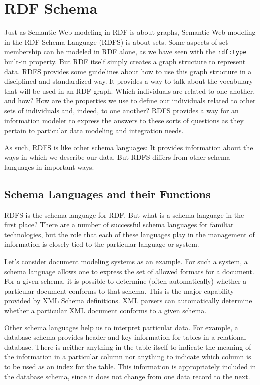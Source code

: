 \chapter{RDF Schema}
\label{ch8}

Just as Semantic Web modeling in RDF is about graphs, Semantic Web
modeling in the RDF Schema Language (RDFS) is about sets. Some aspects
of set membership can be modeled in RDF alone, as we have seen with the
\texttt{rdf:type} built-in property. But RDF itself simply creates a graph
structure to represent data. RDFS provides some guidelines about how to
use this graph structure in a disciplined and standardized way. It
provides a way to talk about the vocabulary that will be used in an RDF
graph. Which individuals are related to one another, and how? How are
the properties we use to define our individuals related to other sets of
individuals and, indeed, to one another? RDFS provides a way for an
information modeler to express the answers to these sorts of questions
as they pertain to particular data modeling and integration needs.

As such, RDFS is like other schema languages: It provides information
about the ways in which we describe our data. But RDFS differs from
other schema languages in important ways.

\section{Schema Languages and their Functions}

RDFS is the schema language for RDF. But what is a schema language in
the first place? There are a number of successful schema languages for
familiar technologies, but the role that each of these languages play in
the management of information is closely tied to the particular language
or system.

Let's consider document modeling systems as an example. For such a
system, a schema language allows one to express the set of allowed
formats for a document. For a given schema, it is possible to determine
(often automatically) whether a particular document conforms to that
schema. This is the major capability provided by XML Schema definitions.
XML parsers can automatically determine whether a particular XML
document conforms to a given schema.

Other schema languages help us to interpret particular data. For
example, a database schema
provides header and key information for tables in a relational database.
There is neither anything in the table itself to indicate the meaning of
the information in a particular column nor anything to indicate which
column is to be used as an index for the table. This information is
appropriately included in the database schema, since it does not change
from one data record to the next.

